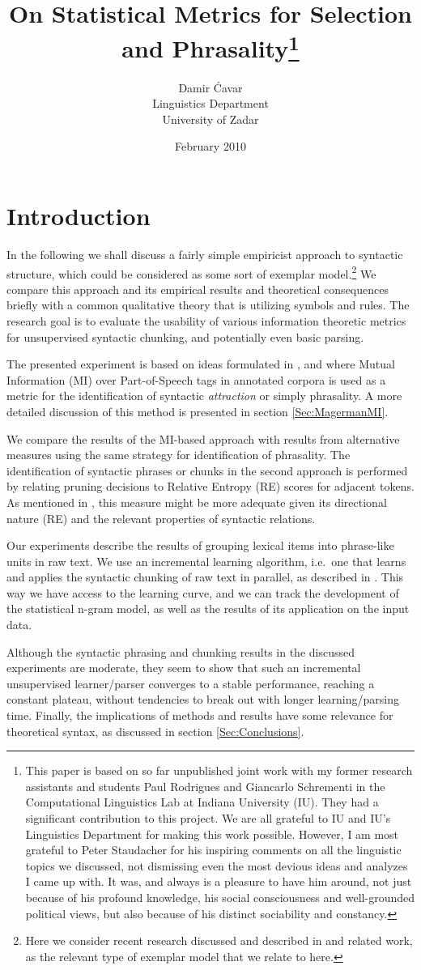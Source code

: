 \documentclass[11pt,a4paper,english]{article}
\title{On Statistical Metrics for Selection and Phrasality\footnote{This paper is based on so far unpublished joint work with my former research assistants and students Paul Rodrigues and Giancarlo Schrementi in the Computational Linguistics Lab at Indiana University (IU). They had a significant contribution to this project. We are all grateful to IU and IU's Linguistics Department for making this work possible. However, I am most grateful to Peter Staudacher for his inspiring comments on all the linguistic topics we discussed, not dismissing even the most devious ideas and analyzes I came up with. It was, and always is a pleasure to have him around, not just because of his profound knowledge, his social consciousness and well-grounded political views, but also because of his distinct sociability and constancy.}}
\author{Damir Ćavar\\ Linguistics Department\\ University of Zadar}
\date{February 2010}
\begin{document}
\maketitle


\section{Introduction}

In the following we shall discuss a fairly simple empiricist approach to syntactic structure, which could be considered as some sort of exemplar model.\footnote{Here we consider recent research discussed and described in \cite{Bod:2009} and related work, as the relevant type of exemplar model that we relate to here.} We compare this approach and its empirical results and theoretical consequences briefly with a common qualitative theory that is utilizing symbols and rules. The research goal is to evaluate the usability of various information theoretic metrics for unsupervised syntactic chunking, and potentially even basic parsing.

The presented experiment is based on ideas formulated in \cite{Magerman:Marcus:1990}, and \cite{Magerman:1994} where Mutual Information (MI) over Part-of-Speech tags in annotated corpora is used as a metric for the identification of syntactic \textit{attraction} or simply phrasality. A more detailed discussion of this method is presented in section \ref{Sec:MagermanMI}.

We compare the results of the MI-based approach with results from alternative measures using the same strategy for identification of phrasality. The identification of syntactic phrases or chunks in the second approach is performed by relating pruning decisions to Relative Entropy (RE) scores for adjacent tokens. As mentioned in \cite{Cavar:ea:2004}, this measure might be more adequate given its directional nature (RE) and the relevant properties of syntactic relations.

Our experiments describe the results of grouping lexical items into phrase-like units in raw text. We use an incremental learning algorithm, i.e.\ one that learns and applies the syntactic chunking of raw text in parallel, as described in \cite{Cavar:ea:2004}. This way we have access to the learning curve, and we can track the development of the statistical n-gram model, as well as the results of its application on the input data.

Although the syntactic phrasing and chunking results in the discussed experiments are moderate, they seem to show that such an incremental unsupervised learner/parser converges to a stable performance, reaching a constant plateau, without tendencies to break out with longer learning/parsing time. Finally, the implications of methods and results have some relevance for theoretical syntax, as discussed in section \ref{Sec:Conclusions}.
\end{document}
